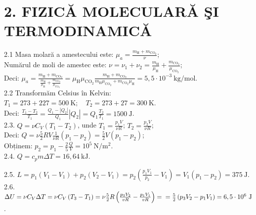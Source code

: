 
\section*{2. FIZICĂ MOLECULARĂ ŞI TERMODINAMICĂ}

2.1 Masa molară a amestecului este: $\mu_{a}=\frac{m_{\mathrm{H}}+m_{\mathrm{CO}_{2}}}{\nu}$;\\ Numărul de moli de amestec este: $\nu=\nu_{1}+\nu_{2}=\frac{m_{\mathrm{H}}}{\mu_{\mathrm{H}}}+\frac{m_{\mathrm{CO}_{2}}}{\mu_{\mathrm{CO}_{2}}}$;\\ Deci: $\mu_{a}=\frac{m_{\mathrm{H}}+m_{\mathrm{CO}_{2}}}{\frac{m_{\mathrm{H}}}{\mu_{\mathrm{H}}}+\frac{m_{\mathrm{CO}_{2}}}{\mu_{\mathrm{CO}_{2}}}}=\mu_{\mathrm{H}} \mu_{\mathrm{CO}_{2}} \frac{m_{\mathrm{H}}+m_{\mathrm{CO}_{2}}}{m_{\mathrm{H}} \mu_{\mathrm{CO}_{2}}+m_{\mathrm{CO}_{2}} \mu_{\mathrm{H}}}=5,5 \cdot 10^{-3} \mathrm{~kg} / \mathrm{mol}$.\\

2.2 Transformăm Celsius în Kelvin:\\ $T_{1}=273+227=500 \mathrm{~K}; \quad T_{2}=273+27=300 \mathrm{~K}$.\\ Deci: $\frac{T_{1}-T_{2}}{T_{1}}=\frac{Q_{1}-\left|Q_{2}\right|}{Q_{1}}\left|Q_{2}\right|=Q_{1} \frac{T_{2}}{T_{1}}=1500 \mathrm{~J}$.\\

2.3. $Q=\nu C_{V}\left(T_{1}-T_{2}\right)$, unde $T_{1}=\frac{p_{1} V}{\nu R}$; $T_{2}=\frac{p_{2} V}{\nu R}$;\\ Deci: $Q=\nu \frac{5}{2} R V \frac{1}{\nu R}\left(p_{1}-p_{2}\right)=\frac{5}{2} V\left(p_{1}-p_{2}\right)$;\\ Obținem: $p_{2}=p_{1}-\frac{2}{5} \frac{Q}{V}=10^{5} \mathrm{~N} / \mathrm{m}^{2}$.\\

2.4. $Q=c_{p} m \Delta T=16,64 \mathrm{~kJ}$.

2.5. $L=p_{1}\left(V_{1}-V_{1}\right)+p_{2}\left(V_{2}-V_{1}\right)=p_{2}\left(\frac{p_{1} V_{1}}{p_{2}}-V_{1}\right)=V_{1}\left(p_{1}-p_{2}\right)=375 \mathrm{~J}$.\\

2.6. $\Delta U=\nu C_{V} \Delta T=\nu C_{V}\left(T_{3}-T_{1}\right)=\nu \frac{5}{2} R\left(\frac{p_{3} V_{2}}{v R}-\frac{p_{1} V_{1}}{v R}\right)= \\ =\frac{5}{2}\left(p_{3} V_{2}-p_{1} V_{1}\right)=6,5 \cdot 10^{6} \mathrm{~J}$.\\

